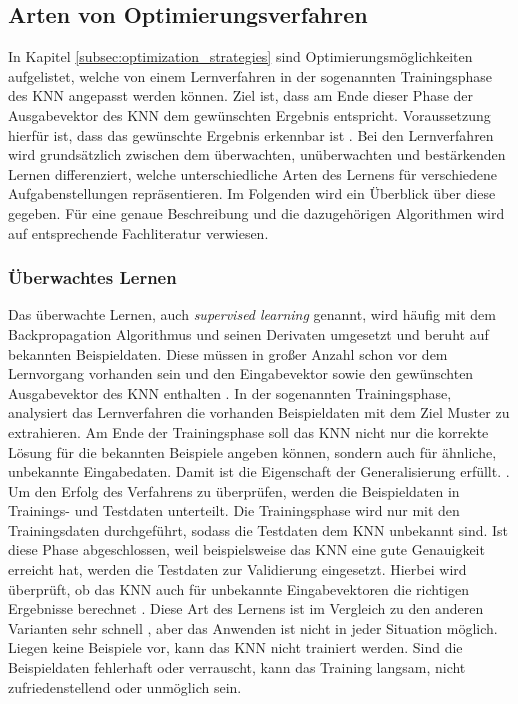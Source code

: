\subsection{Arten von Optimierungsverfahren}
\label{subsec:learning_in_neural_networks}
In Kapitel \ref{subsec:optimization_strategies} sind Optimierungsmöglichkeiten aufgelistet, welche von einem Lernverfahren in der sogenannten Trainingsphase des \ac{KNN} angepasst werden können. Ziel ist, dass am Ende dieser Phase der Ausgabevektor des \ac{KNN} dem gewünschten Ergebnis entspricht. Voraussetzung hierfür ist, dass das gewünschte Ergebnis erkennbar ist \cite{zell2003simulation}. Bei den Lernverfahren wird grundsätzlich zwischen dem überwachten, unüberwachten und bestärkenden Lernen differenziert, welche unterschiedliche Arten des Lernens für verschiedene Aufgabenstellungen repräsentieren. Im Folgenden wird ein Überblick über diese gegeben. Für eine genaue Beschreibung und die dazugehörigen Algorithmen wird auf entsprechende Fachliteratur verwiesen.

\subsubsection{Überwachtes Lernen}
\label{subsubsec:supervised_learning}
Das überwachte Lernen, auch \emph{supervised learning} genannt, wird häufig mit dem Backpropagation Algorithmus und seinen Derivaten umgesetzt und beruht auf bekannten Beispieldaten. Diese müssen in großer Anzahl schon vor dem Lernvorgang vorhanden sein und den Eingabevektor sowie den gewünschten Ausgabevektor des \ac{KNN} enthalten \cite{zell2003simulation}. In der sogenannten Trainingsphase, analysiert das Lernverfahren die vorhanden Beispieldaten mit dem Ziel Muster zu extrahieren. Am Ende der Trainingsphase soll das \ac{KNN} nicht nur die korrekte Lösung für die bekannten Beispiele angeben können, sondern auch für ähnliche, unbekannte Eingabedaten. Damit ist die Eigenschaft der Generalisierung erfüllt. \cite{zell2003simulation}. Um den Erfolg des Verfahrens zu überprüfen, werden die Beispieldaten in Trainings- und Testdaten unterteilt. Die Trainingsphase wird nur mit den Trainingsdaten durchgeführt, sodass die Testdaten dem \ac{KNN} unbekannt sind. Ist diese Phase abgeschlossen, weil beispielsweise das \ac{KNN} eine gute Genauigkeit erreicht hat, werden die Testdaten zur Validierung eingesetzt. Hierbei wird überprüft, ob das \ac{KNN} auch für unbekannte Eingabevektoren die richtigen Ergebnisse berechnet \cite{kriesel2008kleiner}. Diese Art des Lernens ist im Vergleich zu den anderen Varianten sehr schnell \cite{zell2003simulation}, aber das Anwenden ist nicht in jeder Situation möglich. Liegen keine Beispiele vor, kann das \ac{KNN} nicht trainiert werden. Sind die Beispieldaten fehlerhaft oder verrauscht, kann das Training langsam, nicht zufriedenstellend oder unmöglich sein.

